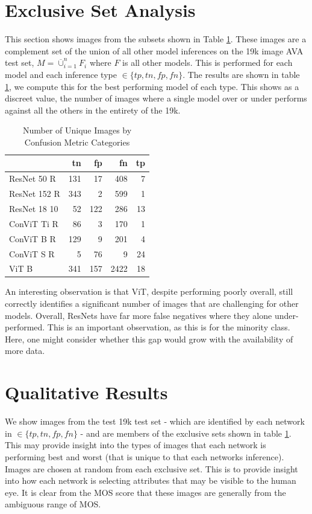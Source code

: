 \section{Exclusive Set Analysis}
\label{sec:exclusive set}

This section shows images from the subsets shown in Table \ref{tab:unique}. These images are a complement set of the union of all other model inferences on the 19k image AVA test set, $M= \overline{\cup}_{i=1}^{n}F_{i}$ where $F$ is all other models.  This is performed for each model and each inference type $\in \{tp,tn,fp,fn\}$. The results are shown in table \ref{tab:unique}, we compute this for the best performing model of each type. This shows as a discreet value, the number of images where a single model over or under performs against all the others in the entirety of the 19k.  

\begin{table}[ht!]
\small 
    \centering
\begin{tabular}{lrrrr}
\toprule
{} &    tn &    fp &    fn &     tp \\
\midrule
ResNet 50 R  &   131 &    17 &   408 &      7 \\
ResNet 152 R &   343 &     2 &   599 &      1 \\
ResNet 18 10 &    52 &   122 &   286 &     13 \\
ConViT Ti R  &    86 &     3 &   170 &      1 \\
ConViT B R   &   129 &     9 &   201 &      4 \\
ConViT S R   &     5 &    76 &     9 &     24 \\
ViT B        &   341 &   157 &  2422 &     18 \\
\bottomrule
\end{tabular}
    \caption{Number of Unique Images by Confusion Metric Categories}
    \label{tab:unique}
\end{table}

An interesting observation is that ViT, despite performing poorly overall, still correctly identifies a significant number of images that are challenging for other models. Overall, ResNets have far more false negatives where they alone under-performed. This is an important observation, as this is for the minority class. Here, one might consider whether this gap would grow with the availability of more data. 





\section{Qualitative Results}
\label{sec:Qualitative Results}
We show images from the test 19k test set - which are identified by each network in $\in \{tp,tn,fp,fn\}$ - and are members of the exclusive sets shown in table \ref{tab:unique}. This may provide insight into the types of images that each network is performing best and worst (that is unique to that each networks inference). Images are chosen at random from each exclusive set. This is to provide insight into how each network is selecting attributes that may be visible to the human eye.  It is clear from the MOS score that these images are generally from the ambiguous range of MOS. 

